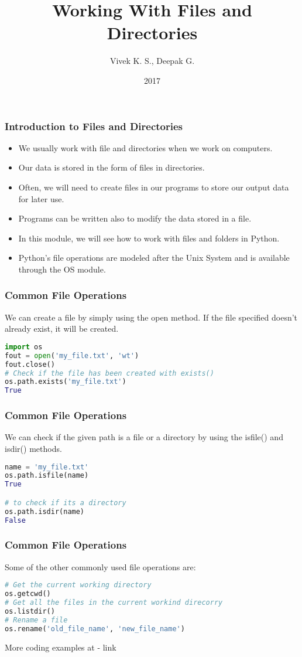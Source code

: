 \documentclass{beamer}
\title{Working With Files and Directories}
\author{Vivek K. S., Deepak G.}
\institute{Information Systems Decision Sciences (ISDS)\\
MUMA College of Business\\
University of South Florida \\
Tampa, Florida}
\date{2017}
\begin{document}
\frame{\titlepage}

\begin{frame}
\frametitle{Introduction to Files and Directories}
\begin{itemize}
\item We usually work with file and directories when we work on computers.
\item Our data is stored in the form of files in directories.
\item Often, we will need to create files in our programs to store our output data for later use.
\item Programs can be written also to modify the data stored in a file.
\item In this module, we will see how to work with files and folders in Python.
\item Python's file operations are modeled after the Unix System and is available through the OS module.
\end{itemize}
\end{frame}

\begin{frame}[fragile]
\frametitle{Common File Operations}
We can create a file by simply using the open method. If the file specified doesn't already exist, it will be created.
\begin{lstlisting}[language=Python]
import os
fout = open('my_file.txt', 'wt')
fout.close()
# Check if the file has been created with exists()
os.path.exists('my_file.txt')
True
\end{lstlisting}
\end{frame}

\begin{frame}[fragile]
\frametitle{Common File Operations}
We can check if the given path is a file or a directory by using the isfile() and isdir() methods.
\begin{lstlisting}[language=Python]
name = 'my_file.txt'
os.path.isfile(name)
True

# to check if its a directory
os.path.isdir(name)
False
\end{lstlisting}
\end{frame}


\begin{frame}[fragile]
\frametitle{Common File Operations}
Some of the other commonly used file  operations are:
\begin{lstlisting}[language=Python]
# Get the current working directory
os.getcwd()
# Get all the files in the current workind direcorry
os.listdir()
# Rename a file
os.rename('old_file_name', 'new_file_name')
\end{lstlisting}

More coding examples at - link
\end{frame}
\end{document}
